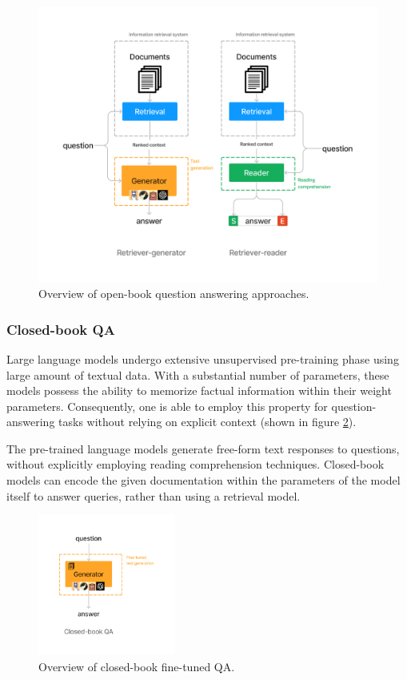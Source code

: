 \documentclass[a4paper,12pt]{article}
\begin{document}
\begin{figure}[htbp]
  \centering
  \includegraphics[width=0.8\linewidth]{figures/openbook.png}
  \caption{Overview of open-book question answering approaches.}
  \label{fig:openbook}
\end{figure}

\subsubsection{Closed-book QA}
Large language models undergo extensive unsupervised pre-training phase using large amount of textual data. With a substantial number of parameters, these models possess the ability to memorize factual information within their weight parameters. Consequently, one is able to employ this property for question-answering tasks without relying on explicit context (shown in figure \ref{fig:closedbook}). 

The pre-trained language models generate free-form text responses to questions, without explicitly employing reading comprehension techniques.
Closed-book models can encode the given documentation within the parameters of the model itself to answer queries, rather than using a retrieval model.

\begin{figure}
  \begin{center}
    \includegraphics[width=0.4\textwidth]{figures/closedbook.png}
  \end{center}
\caption{Overview of closed-book fine-tuned QA.}
\label{fig:closedbook}
\end{figure}
\end{document}
